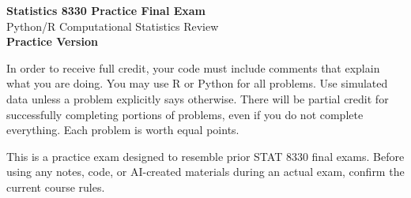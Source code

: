\documentclass[11pt]{article}
\begin{document}
\begin{center}
    {\Large \textbf{Statistics 8330 Practice Final Exam}}\\[0.35em]
    {\large Python/R Computational Statistics Review}\\[0.35em]
    \textbf{Practice Version}
\end{center}

In order to receive full credit, your code must include comments that explain what you are doing.
You may use R or Python for all problems. Use simulated data unless a problem explicitly says otherwise.
There will be partial credit for successfully completing portions of problems, even if you do not complete everything.
Each problem is worth equal points.

This is a practice exam designed to resemble prior STAT 8330 final exams. Before using any notes, code, or AI-created materials during an actual exam, confirm the current course rules.

\bigskip
\end{document}

